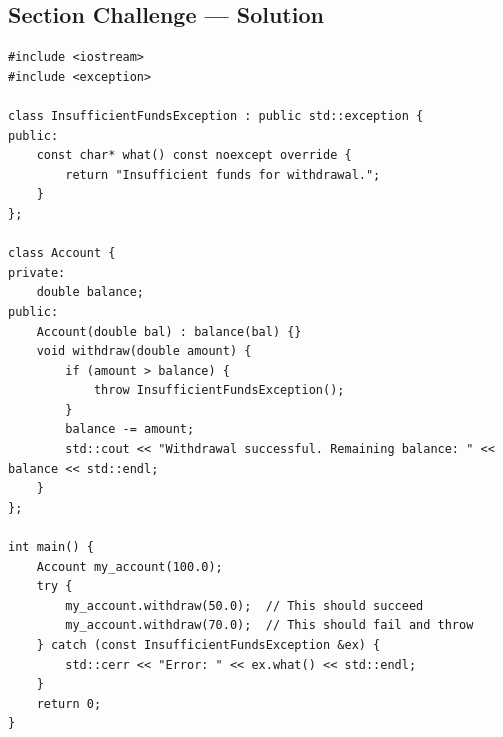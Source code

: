 \subsection{Section Challenge --- Solution}
\begin{lstlisting}
#include <iostream>
#include <exception>

class InsufficientFundsException : public std::exception {
public:
	const char* what() const noexcept override {
		return "Insufficient funds for withdrawal.";
	}
};

class Account {
private:
	double balance;
public:
	Account(double bal) : balance(bal) {}
	void withdraw(double amount) {
		if (amount > balance) {
			throw InsufficientFundsException();
		}
		balance -= amount;
		std::cout << "Withdrawal successful. Remaining balance: " << balance << std::endl;
	}
};

int main() {
	Account my_account(100.0);
	try {
		my_account.withdraw(50.0);  // This should succeed
		my_account.withdraw(70.0);  // This should fail and throw
	} catch (const InsufficientFundsException &ex) {
		std::cerr << "Error: " << ex.what() << std::endl;
	}
	return 0;
}
\end{lstlisting}

